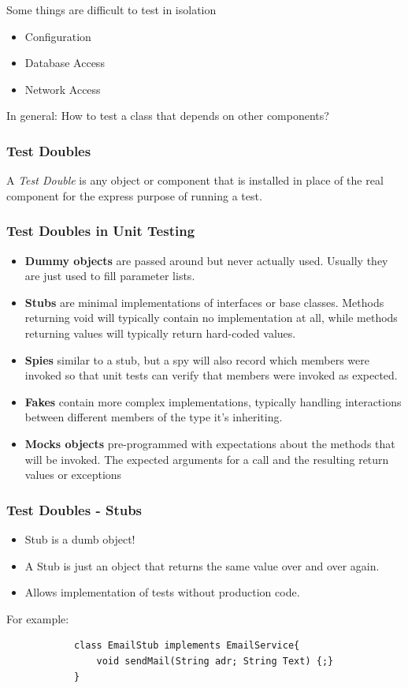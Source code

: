 \documentclass[10pt]{article}
\begin{document}
	Some things are difficult to test in isolation 
	\begin{itemize}
		\item Configuration
		\item Database Access
		\item Network Access
	\end{itemize}
	In general: How to test a class that depends on other components?
	
	\subsubsection{Test Doubles}
	A \textit{Test Double} is any object or component that is installed in place of the real component for the express purpose of running a test.
	
	\subsubsection{Test Doubles in Unit Testing}
	\begin{itemize}
		\item \textbf{Dummy objects} are passed around but never actually used. Usually they are just used to fill parameter lists.
		\item \textbf{Stubs} are minimal implementations of interfaces or base classes. Methods returning void will typically contain no implementation at all, while methods returning values will typically return hard-coded values.
		\item \textbf{Spies} similar to a stub, but a spy will also record which members were invoked so that unit tests can verify that members were invoked as expected.
		\item \textbf{Fakes} contain more complex implementations, typically handling interactions between different members of the type it\textquoteright s inheriting.
		\item \textbf{Mocks objects} pre-programmed with expectations about the methods that will be invoked. The expected arguments for a call and the resulting return values or exceptions
	\end{itemize}
    
    \subsubsection{Test Doubles - Stubs}
    \begin{itemize}
    	\item Stub is a dumb object!
		\item A Stub is just an object that returns the same value over and over again.
		\item Allows implementation of tests without production code.
    \end{itemize}
    \newpage
    For example: \begin{verbatim}
			class EmailStub implements EmailService{
  				void sendMail(String adr; String Text) {;}
			}
		\end{verbatim}
    
\end{document}
